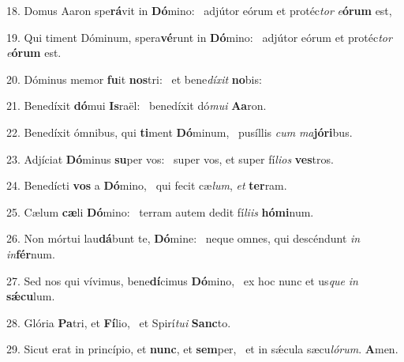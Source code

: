 18. Domus Aaron spe\textbf{rá}vit in \textbf{Dó}mino: \ast\  adjútor eórum et protéc\textit{tor} \textit{e}\textbf{ó}\textbf{rum} est,\

19. Qui timent Dóminum, spera\textbf{vé}runt in \textbf{Dó}mino: \ast\  adjútor eórum et protéc\textit{tor} \textit{e}\textbf{ó}\textbf{rum} est.\

20. Dóminus memor \textbf{fu}it \textbf{nos}tri: \ast\  et bene\textit{dí}\textit{xit} \textbf{no}bis:\

21. Benedíxit \textbf{dó}mui \textbf{Is}raël: \ast\  benedíxit dó\textit{mu}\textit{i} \textbf{A}\textbf{a}ron.\

22. Benedíxit ómnibus, qui \textbf{ti}ment \textbf{Dó}minum, \ast\  pusíllis \textit{cum} \textit{ma}\textbf{jó}\textbf{ri}bus.\

23. Adjíciat \textbf{Dó}minus \textbf{su}per vos: \ast\  super vos, et super fí\textit{li}\textit{os} \textbf{ves}tros.\

24. Benedícti \textbf{vos} a \textbf{Dó}mino, \ast\  qui fecit cæ\textit{lum}, \textit{et} \textbf{ter}ram.\

25. Cælum \textbf{cæ}li \textbf{Dó}mino: \ast\  terram autem dedit fí\textit{li}\textit{is} \textbf{hó}\textbf{mi}num.\

26. Non mórtui lau\textbf{dá}bunt te, \textbf{Dó}mine: \ast\  neque omnes, qui descéndunt \textit{in} \textit{in}\textbf{fér}num.\

27. Sed nos qui vívimus, bene\textbf{dí}cimus \textbf{Dó}mino, \ast\  ex hoc nunc et us\textit{que} \textit{in} \textbf{sǽ}\textbf{cu}lum.\

28. Glória \textbf{Pa}tri, et \textbf{Fí}lio, \ast\  et Spirí\textit{tu}\textit{i} \textbf{Sanc}to.\

29. Sicut erat in princípio, et \textbf{nunc}, et \textbf{sem}per, \ast\  et in sǽcula sæcu\textit{ló}\textit{rum}. \textbf{A}men.\

